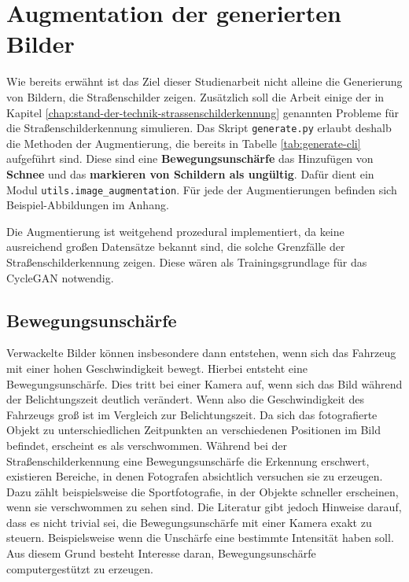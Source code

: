 \chapter{Augmentation der generierten Bilder}

\label{chap:5}

Wie bereits erwähnt ist das Ziel dieser Studienarbeit nicht alleine die Generierung von Bildern, die Straßenschilder zeigen. Zusätzlich soll die Arbeit einige der in Kapitel \ref{chap:stand-der-technik-strassenschilderkennung} genannten Probleme für die Straßenschilderkennung simulieren. Das Skript \texttt{generate.py} erlaubt deshalb die Methoden der Augmentierung, die bereits in Tabelle \ref{tab:generate-cli} aufgeführt sind. Diese sind eine \textbf{Bewegungsunschärfe} das Hinzufügen von \textbf{Schnee} und das \textbf{markieren von Schildern als ungültig}. Dafür dient ein Modul \texttt{utils.image_augmentation}. Für jede der Augmentierungen befinden sich Beispiel-Abbildungen im Anhang.

Die Augmentierung ist weitgehend prozedural implementiert, da keine ausreichend großen Datensätze bekannt sind, die solche Grenzfälle der Straßenschilderkennung zeigen. Diese wären als Trainingsgrundlage für das \ac{CycleGAN} notwendig.

\section{Bewegungsunschärfe}
\label{sec:motion-blur}
Verwackelte Bilder können insbesondere dann entstehen, wenn sich das Fahrzeug mit einer hohen Geschwindigkeit bewegt. Hierbei entsteht eine Bewegungsunschärfe. Dies tritt bei einer Kamera auf, wenn sich das Bild während der Belichtungszeit deutlich verändert. Wenn also die Geschwindigkeit des Fahrzeugs groß ist im Vergleich zur Belichtungszeit. Da sich das fotografierte Objekt zu unterschiedlichen Zeitpunkten an verschiedenen Positionen im Bild befindet, erscheint es als verschwommen. Während bei der Straßenschilderkennung eine Bewegungsunschärfe die Erkennung erschwert, existieren Bereiche, in denen Fotografen absichtlich versuchen sie zu erzeugen. Dazu zählt beispielsweise die Sportfotografie, in der Objekte schneller erscheinen, wenn sie verschwommen zu sehen sind. Die Literatur gibt jedoch Hinweise darauf, dass es nicht trivial sei, die Bewegungsunschärfe mit einer Kamera exakt zu steuern. Beispielsweise wenn die Unschärfe eine bestimmte Intensität haben soll. Aus diesem Grund besteht Interesse daran, Bewegungsunschärfe computergestützt zu erzeugen. \cite{motion-blur}

